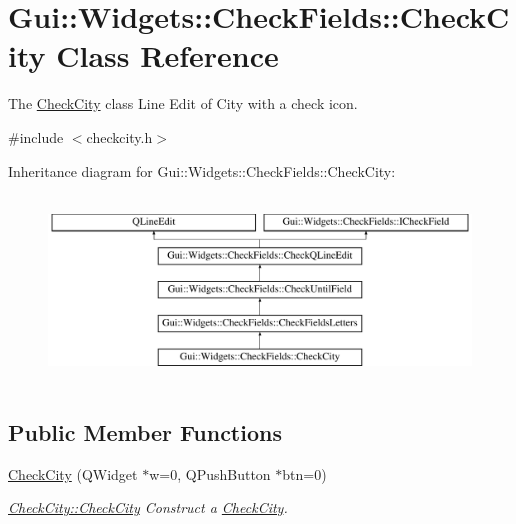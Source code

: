 \hypertarget{classGui_1_1Widgets_1_1CheckFields_1_1CheckCity}{}\section{Gui\+:\+:Widgets\+:\+:Check\+Fields\+:\+:Check\+City Class Reference}
\label{classGui_1_1Widgets_1_1CheckFields_1_1CheckCity}


The \hyperlink{classGui_1_1Widgets_1_1CheckFields_1_1CheckCity}{Check\+City} class Line Edit of City with a check icon.  




{\ttfamily \#include $<$checkcity.\+h$>$}

Inheritance diagram for Gui\+:\+:Widgets\+:\+:Check\+Fields\+:\+:Check\+City\+:\begin{figure}[H]
\begin{center}
\leavevmode
\includegraphics[height=5.000000cm]{dd/da5/classGui_1_1Widgets_1_1CheckFields_1_1CheckCity}
\end{center}
\end{figure}
\subsection*{Public Member Functions}
\begin{DoxyCompactItemize}
\item 
\hyperlink{classGui_1_1Widgets_1_1CheckFields_1_1CheckCity_a880266cfcc69ab006f907748ec35a101}{Check\+City} (Q\+Widget $\ast$w=0, Q\+Push\+Button $\ast$btn=0)
\begin{DoxyCompactList}\small\item\em \hyperlink{classGui_1_1Widgets_1_1CheckFields_1_1CheckCity_a880266cfcc69ab006f907748ec35a101}{Check\+City\+::\+Check\+City} Construct a \hyperlink{classGui_1_1Widgets_1_1CheckFields_1_1CheckCity}{Check\+City}. \end{DoxyCompactList}\end{DoxyCompactItemize}
